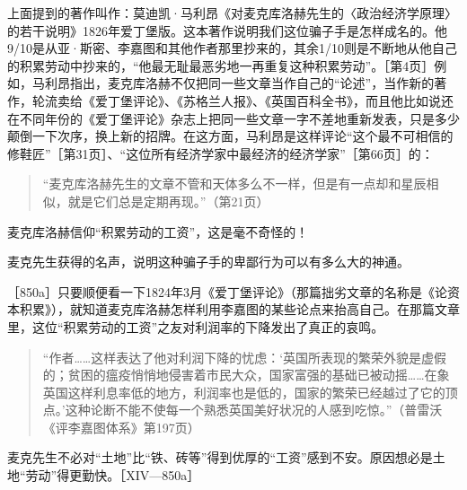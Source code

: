上面提到的著作叫作：莫迪凯·马利昂《对麦克库洛赫先生的〈政治经济学原理〉的若干说明》1826年爱丁堡版。这本著作说明我们这位骗子手是怎样成名的。他9/10是从亚·斯密、李嘉图和其他作者那里抄来的，其余1/10则是不断地从他自己的积累劳动中抄来的，“他最无耻最恶劣地一再重复这种积累劳动”。［第4页］例如，马利昂指出，麦克库洛赫不仅把同一些文章当作自己的“论述”，当作新的著作，轮流卖给《爱丁堡评论》、《苏格兰人报》、《英国百科全书》，而且他比如说还在不同年份的《爱丁堡评论》杂志上把同一些文章一字不差地重新发表，只是多少颠倒一下次序，换上新的招牌。在这方面，马利昂是这样评论“这个最不可相信的修鞋匠”［第31页］、“这位所有经济学家中最经济的经济学家”［第66页］的：

\begin{quote}{“麦克库洛赫先生的文章不管和天体多么不一样，但是有一点却和星辰相似，就是它们总是定期再现。”（第21页）}\end{quote}

麦克库洛赫信仰“积累劳动的工资”，这是毫不奇怪的！

麦克先生获得的名声，说明这种骗子手的卑鄙行为可以有多么大的神通。

［850a］只要顺便看一下1824年3月《爱丁堡评论》（那篇拙劣文章的名称是《论资本积累》），就知道麦克库洛赫怎样利用李嘉图的某些论点来抬高自己。在那篇文章里，这位“积累劳动的工资”之友对利润率的下降发出了真正的哀鸣。

\begin{quote}{“作者……这样表达了他对利润下降的忧虑：‘英国所表现的繁荣外貌是虚假的；贫困的瘟疫悄悄地侵害着市民大众，国家富强的基础已被动摇……在象英国这样利息率低的地方，利润率也是低的，国家的繁荣已经越过了它的顶点。’这种论断不能不使每一个熟悉英国美好状况的人感到吃惊。”（普雷沃《评李嘉图体系》第197页）}\end{quote}

麦克先生不必对“土地”比“铁、砖等”得到优厚的“工资”感到不安。原因想必是土地“劳动”得更勤快。［XIV—850a］

